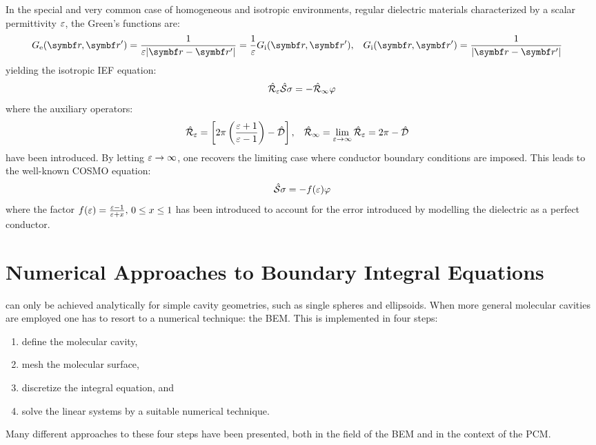In the special and very common case of homogeneous and isotropic
environments, \ie regular dielectric materials characterized by a scalar
permittivity $\varepsilon$, the Green's functions are:
\begin{alignat}{2}
  \Ge = \frac{1}{\diel|\vect{r}-\vect{r}^\prime|} = \frac{1}{\diel} \Gi,
  \quad&
  \Gi = \frac{1}{|\vect{r}-\vect{r}^\prime|}
\end{alignat}
yielding the isotropic \acrshort{IEF} equation:
\begin{equation}\label{eq:isotropic-IEF}
  \hat{\mathcal{R}}_\varepsilon\hat{\mathcal{S}}\sigma = - \hat{\mathcal{R}}_\infty\varphi
\end{equation}
where the auxiliary operators:
\begin{alignat}{2}
  \hat{\mathcal{R}}_\varepsilon = \left[
  2\pi \left(\frac{\varepsilon+1}{\varepsilon-1}\right) - \hat{\mathcal{D}}
  \right],
  \quad&
  \hat{\mathcal{R}}_\infty =  \lim_{\varepsilon\rightarrow\infty}\hat{\mathcal{R}}_\varepsilon
  = 2\pi-\hat{\mathcal{D}}
\end{alignat}
have been introduced.
By letting $\varepsilon\rightarrow\infty$, one recovers the limiting case
where conductor boundary conditions are imposed. This leads to the
well-known \gls{COSMO} equation:\autocite{Klamt1993-mj, Cossi2003-xe}
\begin{equation}
  \hat{\mathcal{S}}\sigma = - f(\varepsilon)\varphi
\end{equation}
where the factor $f(\varepsilon) = \frac{\varepsilon-1}{\varepsilon+x},\, 0\leq x \leq 1$
has been introduced to account for the error introduced by modelling the
dielectric as a perfect conductor.

\section{Numerical Approaches to Boundary Integral Equations}\label{sec:BEM}

 can
only be achieved analytically for simple cavity geometries, such as
single spheres and ellipsoids.
When more general molecular cavities are employed one has to resort to a
numerical technique: the \gls{BEM}. This is implemented in four steps:
\begin{enumerate}
    \item define the molecular cavity,
    \item mesh the molecular surface, \label{item:mesh}
    \item discretize the integral equation, \label{item:discretize} and
    \item solve the linear systems by a suitable numerical technique.
\end{enumerate}
Many different approaches to these four steps have been presented, both
in the field of the \acrshort{BEM} and in the context of the \acrshort{PCM}.

